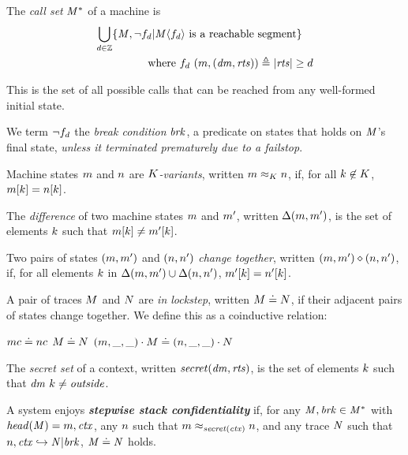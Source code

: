 \documentclass[10pt,conference]{ieeetran}%
\theoremstyle{definition}
\begin{document}
{ The \emph{call set} \(\mathit{M}^*\) of a machine is
\[\begin{aligned}
\bigcup_{d \in \mathbb{Z}} \{\mathit{M}, \neg f_d | \mathit{M}\langle f_d \rangle
\text{ is a reachable segment}\} \hspace{1em} \\
\text{where } f_d ~ (m,(\mathit{dm},\mathit{rts})) \triangleq |\mathit{rts}| \geq d \\
\end{aligned}\]

This is the set of all possible calls that can be reached from any well-formed initial state.

We term \(\neg f_d\) the {\em break condition} \(\mathit{brk}\), a predicate on
states that holds on \(\mathit{M}\)'s final state, {\em unless it terminated prematurely due to a failstop}.

 Machine states \(m\) and \(n\) are {\em \(K\)-variants},
written \(m \approx_K n\), if, for
all \(k \not \in K\), \(m[k] = n[k]\).

 The \emph{difference} of two machine states \(m\) and \(m'\), written \(\Delta(m,m')\),
is the set of elements \(k\)
such that \(m[k] \not = m'[k]\).

 Two pairs of states \((m,m')\) and \((n,n')\)
 {\em change together}, written \((m,m') \diamond (n,n')\), if, for all elements \(k\) in
\(\Delta(m,m') \cup \Delta(n,n')\),
\(m'[k] = n'[k]\).

 A pair of traces \(M\) and \(N\) are {\em in lockstep},
written \(M \doteq N\),
if their adjacent pairs of states change together.  We define this as a coinductive relation:

\judgment{}
         {\(mc \doteq nc\)}
\judgmenttwo{\(\mach, \pi_\mach(\head(\machT)) \diamond \nach, \pi_\mach(\head(\nachT))\)}
            {\(M \doteq N\)}
            {\((m,\relax{\_},\relax{\_}) \cdot M \doteq (n,\relax{\_},\relax{\_}) \cdot N\)}

The \emph{secret set} of a context, written \(\mathit{secret}(\mathit{dm},\mathit{rts})\), is the
set of elements \(k\) such that \(\mathit{dm} ~ k \not = \mathit{outside}\).

A system enjoys \textbf{\textit{stepwise stack confidentiality}} if,
for any \(\mathit{M},\mathit{brk} \in \mathit{M}^*\) with \(\mathit{head}(\mathit{M}) = m,\mathit{ctx}\),
any \(n\) such that \(m \approx_{\mathit{secret}(\mathit{ctx})} n\), and any trace
\(\mathit{N}\) such that \(n,\mathit{ctx} \hookrightarrow \mathit{N} | \mathit{brk}\),
\(\mathit{M} \doteq \mathit{N}\) holds.

}
\end{document}
